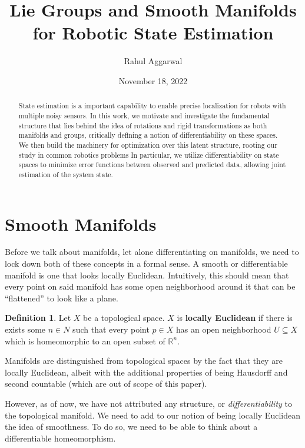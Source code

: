 \documentclass[reqno]{amsart}
\title{Lie Groups and Smooth Manifolds for Robotic State Estimation}
\author{Rahul Aggarwal}
\date{November 18, 2022}
\theoremstyle{definition}
\newtheorem{defn}{Definition}[section]
\numberwithin{equation}{section}
\begin{document}
\begin{abstract}
    State estimation is a important capability to enable precise localization for robots with multiple noisy sensors. In this work, we motivate and investigate the fundamental structure that lies behind the idea of rotations and rigid transformations as both manifolds and groups, critically defining a notion of differentiability on these spaces. We then build the machinery for optimization over this latent structure, rooting our study in common robotics problems In particular, we utilize differentiability on state spaces to minimize error functions between observed and predicted data, allowing joint estimation of the system state.
\end{abstract}

\maketitle

\tableofcontents

\section{Smooth Manifolds}

Before we talk about manifolds, let alone differentiating on manifolds, we need to lock down both of these concepts in a formal sense.
A smooth or differentiable manifold is one that looks locally Euclidean. Intuitively, this should mean that every point on said manifold has some open neighborhood around it that can be ``flattened'' to look like a plane.

\begin{defn}
    Let $X$ be a topological space. $X$ is \textbf{locally Euclidean} if there is exists some $n \in N$ such that every point $p \in X$ has an open neighborhood $U \subseteq X$ which is homeomorphic to an open subset of $\mathbb{R}^n$.
\end{defn}

Manifolds are distinguished from topological spaces by the fact that they are locally Euclidean, albeit with the additional properties of being Hausdorff and second countable (which are out of scope of this paper).

However, as of now, we have not attributed any structure, or \textit{differentiability} to the topological manifold. We need to add to our notion of being locally Euclidean the idea of smoothness. To do so, we need to be able to think about a differentiable homeomorphism.
\end{document}
